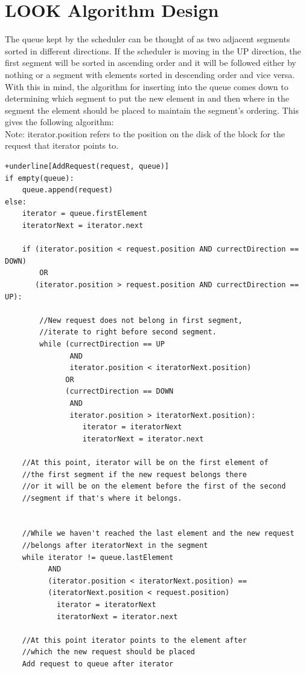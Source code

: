 \documentclass[onecolumn,draftclsnofoot, 10pt, compsoc]{IEEEtran}
\begin{document}
\clearpage
\section{LOOK Algorithm Design}
	The queue kept by the scheduler can be thought of as two adjacent segments sorted in different directions. 
	If the scheduler is moving in the UP direction, the first segment will be sorted in ascending order and it will be followed either by nothing or a segment with elements sorted in descending order and vice versa.
	With this in mind, the algorithm for inserting into the queue comes down to determining which segment to put the new element in and then where in the segment the element should be placed to maintain the segment's ordering.
	This gives the following algorithm: \\

	Note: iterator.position refers to the position on the disk of the block for the request that iterator points to.

\begin{Verbatim}[commandchars=+\[\]]
+underline[AddRequest(request, queue)]
if empty(queue):
	queue.append(request)
else:
	iterator = queue.firstElement
	iteratorNext = iterator.next

	if (iterator.position < request.position AND currectDirection == DOWN)
		OR
	   (iterator.position > request.position AND currectDirection == UP):

		//New request does not belong in first segment, 
		//iterate to right before second segment.
		while (currectDirection == UP 
			   AND 
			   iterator.position < iteratorNext.position)
			  OR
			  (currectDirection == DOWN 
			   AND 
			   iterator.position > iteratorNext.position):
				  iterator = iteratorNext
				  iteratorNext = iterator.next

	//At this point, iterator will be on the first element of 
	//the first segment if the new request belongs there
	//or it will be on the element before the first of the second 
	//segment if that's where it belongs.


	//While we haven't reached the last element and the new request 
	//belongs after iteratorNext in the segment
	while iterator != queue.lastElement
		  AND
		  (iterator.position < iteratorNext.position) == 
		  (iteratorNext.position < request.position)
			iterator = iteratorNext
			iteratorNext = iterator.next

	//At this point iterator points to the element after 
	//which the new request should be placed
	Add request to queue after iterator
\end{Verbatim}
\end{document}
